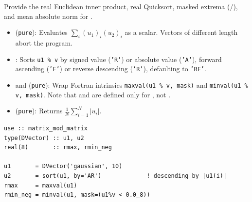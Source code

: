 Provide the real Euclidean inner product, real Quicksort, masked extrema (/), and mean absolute norm for .

\begin{itemize}
  \item {} (\texttt{pure}): Evaluates $\sum_i (u_1)_i (u_2)_i$ as a  scalar. Vectors of different length abort the program.
  \item {}: Sorts \texttt{u1 \% v} by signed value (\texttt{'R'}) or absolute value (\texttt{'A'}), forward ascending (\texttt{'F'}) or reverse descending (\texttt{'R'}), defaulting to \texttt{'RF'}.
  \item {} and  (\texttt{pure}): Wrap Fortran intrinsics \texttt{maxval(u1 \% v, mask)} and \texttt{minval(u1 \% v, mask)}. Note that  and  are defined only for , not .
  \item {} (\texttt{pure}): Returns $\frac{1}{N}\sum_{i=1}^N |u_i|$.
\end{itemize}

\begin{description}[leftmargin=2.2cm, style=nextline]
\end{description}

\lstset{language=[95]Fortran}
\begin{lstlisting}
use :: matrix_mod_matrix
type(DVector) :: u1, u2
real(8)       :: rmax, rmin_neg

u1       = DVector('gaussian', 10)
u2       = sort(u1, by='AR')             ! descending by |u1(i)|
rmax     = maxval(u1)
rmin_neg = minval(u1, mask=(u1%v < 0.0_8))
\end{lstlisting}


